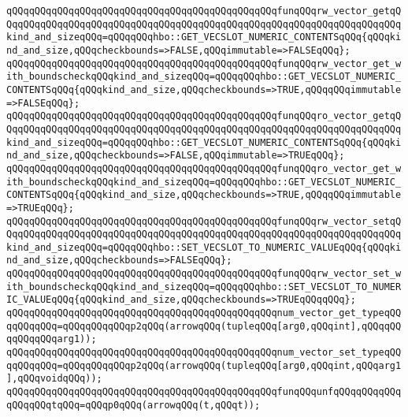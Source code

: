 \newline
\verb|qQQqqQQqqQQqqQQqqQQqqQQqqQQqqQQqqQQqqQQqqQQqqQQqfunqQQqrw_vector_getqQQqqQQqqQQqqQQqqQQqqQQqqQQqqQQqqQQqqQQqqQQqqQQqqQQqqQQqqQQqqQQqqQQqqQQqkind_and_sizeqQQq=qQQqqQQqhbo::GET_VECSLOT_NUMERIC_CONTENTSqQQq{qQQqkind_and_size,qQQqcheckbounds=>FALSE,qQQqimmutable=>FALSEqQQq};|\newline
\verb|qQQqqQQqqQQqqQQqqQQqqQQqqQQqqQQqqQQqqQQqqQQqqQQqfunqQQqrw_vector_get_with_boundscheckqQQqkind_and_sizeqQQq=qQQqqQQqhbo::GET_VECSLOT_NUMERIC_CONTENTSqQQq{qQQqkind_and_size,qQQqcheckbounds=>TRUE,qQQqqQQqimmutable=>FALSEqQQq};|\newline
\newline
\verb|qQQqqQQqqQQqqQQqqQQqqQQqqQQqqQQqqQQqqQQqqQQqqQQqfunqQQqro_vector_getqQQqqQQqqQQqqQQqqQQqqQQqqQQqqQQqqQQqqQQqqQQqqQQqqQQqqQQqqQQqqQQqqQQqqQQqkind_and_sizeqQQq=qQQqqQQqhbo::GET_VECSLOT_NUMERIC_CONTENTSqQQq{qQQqkind_and_size,qQQqcheckbounds=>FALSE,qQQqimmutable=>TRUEqQQq};|\newline
\verb|qQQqqQQqqQQqqQQqqQQqqQQqqQQqqQQqqQQqqQQqqQQqqQQqfunqQQqro_vector_get_with_boundscheckqQQqkind_and_sizeqQQq=qQQqqQQqhbo::GET_VECSLOT_NUMERIC_CONTENTSqQQq{qQQqkind_and_size,qQQqcheckbounds=>TRUE,qQQqqQQqimmutable=>TRUEqQQq};|\newline
\newline
\verb|qQQqqQQqqQQqqQQqqQQqqQQqqQQqqQQqqQQqqQQqqQQqqQQqfunqQQqrw_vector_setqQQqqQQqqQQqqQQqqQQqqQQqqQQqqQQqqQQqqQQqqQQqqQQqqQQqqQQqqQQqqQQqqQQqqQQqkind_and_sizeqQQq=qQQqqQQqhbo::SET_VECSLOT_TO_NUMERIC_VALUEqQQq{qQQqkind_and_size,qQQqcheckbounds=>FALSEqQQq};|\newline
\verb|qQQqqQQqqQQqqQQqqQQqqQQqqQQqqQQqqQQqqQQqqQQqqQQqfunqQQqrw_vector_set_with_boundscheckqQQqkind_and_sizeqQQq=qQQqqQQqhbo::SET_VECSLOT_TO_NUMERIC_VALUEqQQq{qQQqkind_and_size,qQQqcheckbounds=>TRUEqQQqqQQq};|\newline
\newline
\verb|qQQqqQQqqQQqqQQqqQQqqQQqqQQqqQQqqQQqqQQqqQQqqQQqnum_vector_get_typeqQQqqQQqqQQq=qQQqqQQqqQQqp2qQQq(arrowqQQq(tupleqQQq[arg0,qQQqint],qQQqqQQqqQQqqQQqarg1));|\newline
\verb|qQQqqQQqqQQqqQQqqQQqqQQqqQQqqQQqqQQqqQQqqQQqqQQqnum_vector_set_typeqQQqqQQqqQQq=qQQqqQQqqQQqp2qQQq(arrowqQQq(tupleqQQq[arg0,qQQqint,qQQqarg1],qQQqvoidqQQq));|\newline
\newline
\verb|qQQqqQQqqQQqqQQqqQQqqQQqqQQqqQQqqQQqqQQqqQQqqQQqfunqQQqunfqQQqqQQqqQQqqQQqqQQqtqQQq=qQQqp0qQQq(arrowqQQq(t,qQQqt));|\newline

